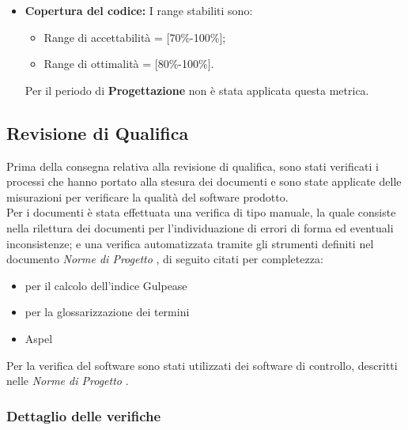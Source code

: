 \begin{itemize}
\item \textbf{Copertura del codice: }I range stabiliti sono:
      \begin{itemize}
        \item Range di accettabilità = [70\%-100\%];
        \item Range di ottimalità = [80\%-100\%].
      \end{itemize}
Per il periodo di \textbf{Progettazione} non è stata applicata questa metrica.

\end{itemize} 





\subsection{Revisione di Qualifica}
  Prima della consegna relativa alla revisione di qualifica, sono stati verificati i processi che hanno portato alla stesura dei documenti e sono state applicate delle misurazioni per verificare la qualità del software prodotto. \\
  Per i documenti è stata effettuata una verifica di tipo manuale, la quale consiste nella rilettura dei documenti per l'individuazione di errori di forma ed eventuali inconsistenze;
  e una verifica automatizzata tramite gli strumenti definiti nel documento \emph{Norme di Progetto \VersioneNP{}}, di seguito citati per completezza:
  \begin{itemize}
    \item {}  per il calcolo dell’indice Gulpease
    \item {}  per la glossarizzazione dei termini
    \item Aspel
  \end{itemize}
  Per la verifica del software sono stati utilizzati dei software di controllo, descritti nelle \emph{Norme di Progetto \VersioneNP{}}.
  \subsubsection{Dettaglio delle verifiche}
